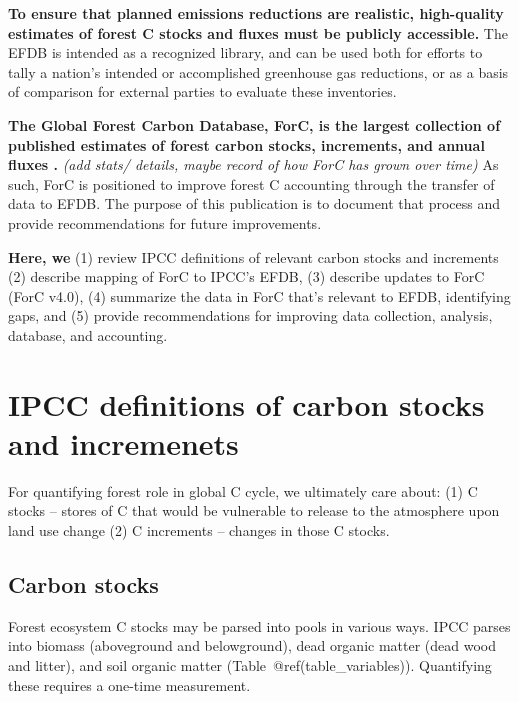 \documentclass[, manuscript]{copernicus}
\begin{document}
\textbf{To ensure that planned emissions reductions are realistic,
high-quality estimates of forest C stocks and fluxes must be publicly
accessible.} The EFDB is intended as a recognized library, and can be
used both for efforts to tally a nation's intended or accomplished
greenhouse gas reductions, or as a basis of comparison for external
parties to evaluate these inventories.

\textbf{The Global Forest Carbon Database, ForC, is the largest
collection of published estimates of forest carbon stocks, increments,
and annual fluxes
\citep{anderson-teixeira_forc_2018, anderson-teixeira_carbon_2021}.}
\emph{(add stats/ details, maybe record of how ForC has grown over
time)} As such, ForC is positioned to improve forest C accounting
through the transfer of data to EFDB. The purpose of this publication is
to document that process and provide recommendations for future
improvements.

\textbf{Here, we} (1) review IPCC definitions of relevant carbon stocks
and increments (2) describe mapping of ForC to IPCC's EFDB, (3) describe
updates to ForC (ForC v4.0), (4) summarize the data in ForC that's
relevant to EFDB, identifying gaps, and (5) provide recommendations for
improving data collection, analysis, database, and accounting.

\section{IPCC definitions of carbon stocks and incremenets}

For quantifying forest role in global C cycle, we ultimately care about:
(1) C stocks -- stores of C that would be vulnerable to release to the
atmosphere upon land use change (2) C increments -- changes in those C
stocks.

\subsection{Carbon stocks}

Forest ecosystem C stocks may be parsed into pools in various ways. IPCC
parses into biomass (aboveground and belowground), dead organic matter
(dead wood and litter), and soil organic matter
(Table~@ref(table\_variables)). Quantifying these requires a one-time
measurement.
\end{document}
